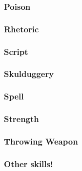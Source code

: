 \subsubsection*{Poison}
\subsubsection*{Rhetoric}   
\subsubsection*{Script}
\subsubsection*{Skulduggery}
\subsubsection*{Spell}
\subsubsection*{Strength}
\subsubsection*{Throwing Weapon}
\subsubsection*{Other skills!}